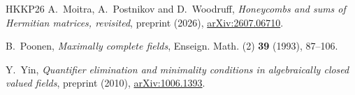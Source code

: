 \begin{thebibliography}{HKKP26}
A.~Moitra, A.~Postnikov and D.~Woodruff,
\emph{Honeycombs and sums of Hermitian matrices, revisited}, preprint
(2026), \href{https://arxiv.org/abs/2607.06710}{arXiv:2607.06710}.

B.~Poonen, \emph{Maximally complete fields}, Enseign. Math. (2)
\textbf{39} (1993), 87--106.

Y.~Yin, \emph{Quantifier elimination and minimality conditions in
algebraically closed valued fields}, preprint (2010),
\href{https://arxiv.org/abs/1006.1393}{arXiv:1006.1393}.

\end{thebibliography}
